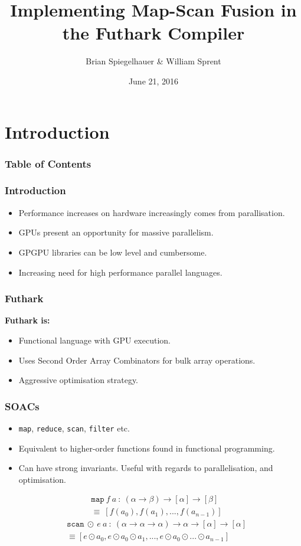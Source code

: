 \documentclass{beamer}
\title{Implementing Map-Scan Fusion in the Futhark Compiler}
\author{Brian Spiegelhauer \&  William Sprent}
\institute{DIKU \\ University of Copenhagen}
\date{June 21, 2016}
\begin{document}
\lstset{language=C, frame=single, numbers=left, breaklines=true}
\frame{\titlepage}
\section[intro]{Introduction}
\begin{frame}
\frametitle{Table of Contents}
\tableofcontents[currentsection]
\end{frame}

\begin{frame}
  \frametitle{Introduction}
  \begin{itemize}
  \item Performance increases on hardware increasingly comes from parallisation.
  \item GPUs present an opportunity for massive parallelism.
  \item GPGPU libraries can be low level and cumbersome.
  \item Increasing need for high performance parallel languages.
  \end{itemize}
\end{frame}

\begin{frame}
  \frametitle{Futhark}
\large \textbf{Futhark is:}
\begin{itemize}
\item Functional language with GPU execution.
\item Uses Second Order Array Combinators for bulk array operations.
\item Aggressive optimisation strategy.
\end{itemize}
\end{frame}

\begin{frame}
  \frametitle{SOACs}
  \begin{itemize}
  \item \texttt{map}, \texttt{reduce}, \texttt{scan}, \texttt{filter} etc.
  \item Equivalent to higher-order functions found in functional programming.
  \item Can have strong invariants. Useful with regards to parallelisation, and optimisation.
  \end{itemize}
  \begin{align*}
    &\mathtt{map} \: f \: a \: :  \: (\alpha \to \beta) \to [\alpha] \to [\beta]\\
    &\equiv  \: [f(a_0), f(a_1), ..., f(a_{n-1})]
  \end{align*}
  \begin{align*}
&\mathtt{scan} \: \odot \: e \: a \: : \:(\alpha \to \alpha \to \alpha) \to \alpha \to [\alpha] \to [\alpha] \\
&\equiv [e \odot a_0, e \odot a_0 \odot a_1, ..., e \odot a_0 \odot ... \odot a_{n-1}]
\end{align*}
\end{frame}
\end{document}
